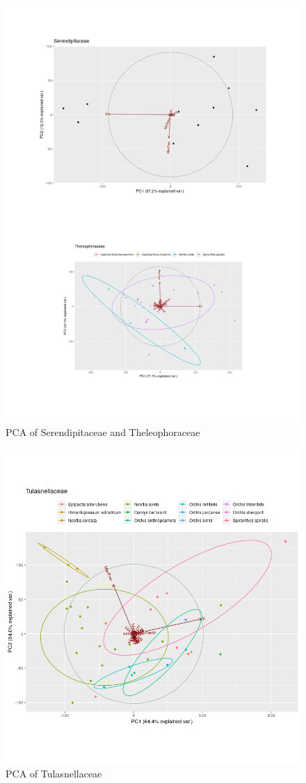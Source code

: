 \begin{figure}[htbp]
\centering
\includegraphics[keepaspectratio,width=\textwidth,height=0.75\textheight]{images/PCAserthe.png}
\caption{PCA of Serendipitaceae and Theleophoraceae}
\end{figure}

\begin{figure}[htbp]
\centering
\includegraphics[keepaspectratio,width=\textwidth,height=0.75\textheight]{images/PCAtul.png}
\caption{PCA of Tulasnellaceae}
\end{figure}




